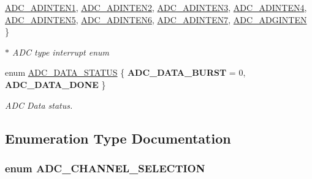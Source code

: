 \begin{DoxyCompactItemize}
\hyperlink{group___a_d_c___public___types_ggae7fc3523a8faf7363895609c07aba95bacf04f25af4315389985fb62ea6526c2b}{\-A\-D\-C\-\_\-\-A\-D\-I\-N\-T\-E\-N1}, 
\hyperlink{group___a_d_c___public___types_ggae7fc3523a8faf7363895609c07aba95ba17cc0e3e08ba5ccc3232766b216e1ff6}{\-A\-D\-C\-\_\-\-A\-D\-I\-N\-T\-E\-N2}, 
\hyperlink{group___a_d_c___public___types_ggae7fc3523a8faf7363895609c07aba95ba19c8e6062363e01e0ed7b2fc67872eb2}{\-A\-D\-C\-\_\-\-A\-D\-I\-N\-T\-E\-N3}, 
\*
\hyperlink{group___a_d_c___public___types_ggae7fc3523a8faf7363895609c07aba95bad1c7cbdb1e5e778e359833390202e7eb}{\-A\-D\-C\-\_\-\-A\-D\-I\-N\-T\-E\-N4}, 
\hyperlink{group___a_d_c___public___types_ggae7fc3523a8faf7363895609c07aba95ba9e09922ec07892458ce2b5593f3af485}{\-A\-D\-C\-\_\-\-A\-D\-I\-N\-T\-E\-N5}, 
\hyperlink{group___a_d_c___public___types_ggae7fc3523a8faf7363895609c07aba95baa2c1ebb14ef504398f4b3bc30c40567e}{\-A\-D\-C\-\_\-\-A\-D\-I\-N\-T\-E\-N6}, 
\hyperlink{group___a_d_c___public___types_ggae7fc3523a8faf7363895609c07aba95baca3cefcfc951e755394130fbd42daba3}{\-A\-D\-C\-\_\-\-A\-D\-I\-N\-T\-E\-N7}, 
\*
\hyperlink{group___a_d_c___public___types_ggae7fc3523a8faf7363895609c07aba95ba8d04f140aa5ed99528b4181569cc54f4}{\-A\-D\-C\-\_\-\-A\-D\-G\-I\-N\-T\-E\-N}
 \}
\begin{DoxyCompactList}\small\item\em $\ast$ \-A\-D\-C type interrupt enum \end{DoxyCompactList}\item 
enum \hyperlink{group___a_d_c___public___types_gaedb5eb329a9f59e2565ef23c2199bcf1}{\-A\-D\-C\-\_\-\-D\-A\-T\-A\-\_\-\-S\-T\-A\-T\-U\-S} \{ {\bfseries \-A\-D\-C\-\_\-\-D\-A\-T\-A\-\_\-\-B\-U\-R\-S\-T} =  0, 
{\bfseries \-A\-D\-C\-\_\-\-D\-A\-T\-A\-\_\-\-D\-O\-N\-E}
 \}
\begin{DoxyCompactList}\small\item\em \-A\-D\-C \-Data status. \end{DoxyCompactList}\end{DoxyCompactItemize}


\subsection{\-Enumeration \-Type \-Documentation}
\hypertarget{group___a_d_c___public___types_ga89aa5114c80540103cfb71c4420b914b}{
\subsubsection[{\-A\-D\-C\-\_\-\-C\-H\-A\-N\-N\-E\-L\-\_\-\-S\-E\-L\-E\-C\-T\-I\-O\-N}]{\setlength{\rightskip}{0pt plus 5cm}enum {\bf \-A\-D\-C\-\_\-\-C\-H\-A\-N\-N\-E\-L\-\_\-\-S\-E\-L\-E\-C\-T\-I\-O\-N}}}\label{group___a_d_c___public___types_ga89aa5114c80540103cfb71c4420b914b}


